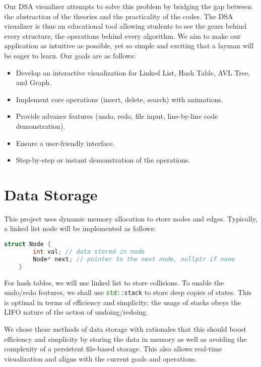 \documentclass{article}
\begin{document}
Our DSA visualizer attempts to solve this problem by bridging the gap between the abstraction of the theories and the practicality of the codes. The DSA visualizer is thus an educational tool allowing students to see the gears behind every structure, the operations behind every algorithm. We aim to make our application as intuitive as possible, yet so simple and exciting that a layman will be eager to learn. Our goals are as follows:
\begin{itemize}
	\item Develop an interactive visualization for Linked List, Hash Table, AVL Tree, and Graph.
	\item Implement core operations (insert, delete, search) with animations.
	\item Provide advance features (undo, redo, file input, line-by-line code demonstration).
	\item Ensure a user-friendly interface.
	\item Step-by-step or instant demonstration of the operations.
\end{itemize}

\section{Data Storage}
This project uses dynamic memory allocation to store nodes and edges. Typically, a linked list node will be implemented as follows:
\begin{lstlisting}[language=c++]
	struct Node {
		int val; // data stored in node
		Node* next; // pointer to the next node, nullptr if none
	}
\end{lstlisting}
For hash tables, we will use linked list to store collisions. To enable the undo/redo features, we shall use \lstinline[language=c++]|std::stack| to store deep copies of states. This is optimal in terms of efficiency and simplicity; the usage of stacks obeys the LIFO nature of the action of undoing/redoing.

We chose these methods of data storage with rationales that this should boost efficiency and simplicity by storing the data in memory as well as avoiding the complexity of a persistent file-based storage. This also allows real-time visualization and aligns with the current goals and operations.
\end{document}
